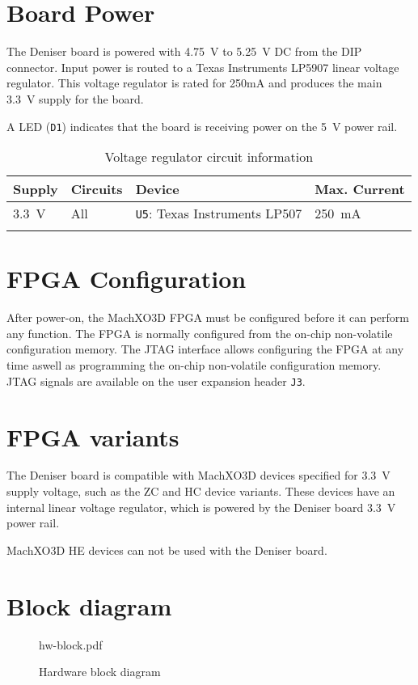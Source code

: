 \documentclass[10pt]{datasheet}
\newcommand{\proj}{Deniser board}
\begin{document}
\section{Board Power}
The \proj{} is powered with \SI{4.75}{V} to \SI{5.25}{V} DC from the DIP
connector.
Input power is routed to a Texas Instruments LP5907
linear voltage regulator.
This voltage regulator is rated for 250mA and produces
the main \SI{3.3}{V} supply for the board.

A LED (\texttt{D1}) indicates that the board is receiving power on the \SI{5}{V} power rail.

\begin{table}[ht]
\caption{Voltage regulator circuit information}
\begin{tabularx}{\textwidth}{l   l   l   X}
    \thickhline
    \textbf{Supply} & \textbf{Circuits} & \textbf{Device} & \textbf{Max. Current} \\
    \hline
    \SI{3.3}{V} & All & \texttt{U5}: Texas Instruments LP507 & \SI{250}{mA} \\
    \thickhline
\end{tabularx}
\end{table}

\section{FPGA Configuration}
After power-on, the MachXO3D FPGA must be configured before it can perform any
function.
The FPGA is normally configured from the on-chip non-volatile configuration
memory.
The JTAG interface allows configuring the FPGA at any time aswell as
programming the on-chip non-volatile configuration memory.
JTAG signals are available on the user expansion header \texttt{J3}.

\section{FPGA variants}
The \proj{} is compatible with MachXO3D devices specified for \SI{3.3}{V}
supply voltage, such as the ZC and HC device variants.
These devices have an internal linear voltage regulator, which is powered by
the \proj{} \SI{3.3}{V} power rail.

MachXO3D HE devices can not be used with the \proj{}.

\section{Block diagram}
\begin{figure}[ht]
\begin{center}
  \begin{includegraphics}[width=0.40\textwidth]{hw-block.pdf}
  \end{includegraphics}
    \caption{Hardware block diagram}
\end{center}
\end{figure}
\end{document}

